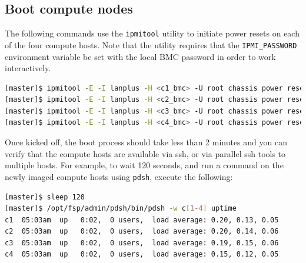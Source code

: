 \documentclass[letterpaper]{article}
\begin{document}
\subsection{Boot compute nodes}

 
The following commands use the \texttt{ipmitool} utility to initiate power
resets on each of the four compute hosts. Note that the utility requires that
the \texttt{IPMI\_PASSWORD} environment variable be set with the local BMC password in
order to work interactively.


\begin{lstlisting}[language=bash,keywords={},upquote=true]
[master]$ ipmitool -E -I lanplus -H <c1_bmc> -U root chassis power reset   # power cycle c1
[master]$ ipmitool -E -I lanplus -H <c2_bmc> -U root chassis power reset   # power cycle c2
[master]$ ipmitool -E -I lanplus -H <c3_bmc> -U root chassis power reset   # power cycle c3
[master]$ ipmitool -E -I lanplus -H <c4_bmc> -U root chassis power reset   # power cycle c4
\end{lstlisting} 



Once kicked off, the boot process should take less than 2 minutes and you can
verify that the compute hosts are available via ssh, or via parallel ssh tools to multiple
hosts. For example, to wait 120 seconds, and run a command on the newly imaged
compute hosts using \texttt{pdsh}, execute the following:

\begin{lstlisting}[language=bash]
[master]$ sleep 120
[master]$ /opt/fsp/admin/pdsh/bin/pdsh -w c[1-4] uptime
c1  05:03am  up   0:02,  0 users,  load average: 0.20, 0.13, 0.05
c2  05:03am  up   0:02,  0 users,  load average: 0.20, 0.14, 0.06
c3  05:03am  up   0:02,  0 users,  load average: 0.19, 0.15, 0.06
c4  05:03am  up   0:02,  0 users,  load average: 0.15, 0.12, 0.05
\end{lstlisting}
\end{document}
